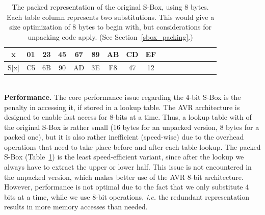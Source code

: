 \documentclass[11pt]{article}
\begin{document}
\begin{table}[h]
\centering
\footnotesize
\begin{tabular}{| c | c  | c | c | c  | c | c | c  | c | c | c  | c | c | c  | c | c | c |}
\hline
  x & 01 & 23 & 45 & 67 & 89 & AB & CD & EF   \\
\hline
  S[x] & C5 & 6B & 90 & AD & 3E & F8 & 47 & 12   \\
\hline
\end{tabular}
 \caption{\footnotesize The packed representation of the original S-Box, using 8 bytes. Each table column represents two substitutions. This would give a size optimization of 8 bytes to begin with, but considerations for unpacking code apply. (See Section~\ref{sbox_packing}.)}
 \label{packed_sbox}
\end{table}\\
\textbf{Performance.} The core performance issue regarding the 4-bit S-Box is the penalty in accessing it, if stored in a lookup table. The AVR architecture is designed to enable fast access for 8-bits at a time. Thus, a lookup table with of the original S-Box is rather small (16 bytes for an unpacked version, 8 bytes for a packed one), but it is also rather inefficient (speed-wise) due to the overhead operations that need to take place before and after each table lookup. The packed S-Box (Table~\ref{packed_sbox}) is the least speed-efficient variant, since after the lookup we always have to extract the upper or lower half. This issue is not encountered in the unpacked version, which makes better use of the AVR 8-bit architecture. However, performance is not optimal  due to the fact that we only substitute 4 bits at a time, while we use 8-bit operations, \emph{i.e.} the redundant representation results in more memory accesses than needed. 
\end{document}
